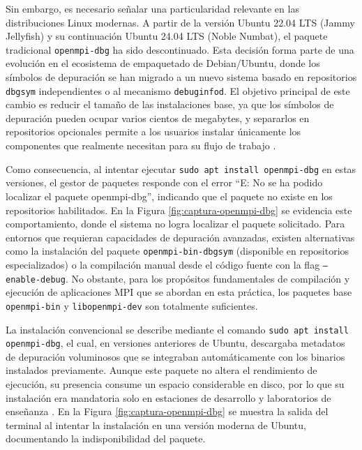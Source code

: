 Sin embargo, es necesario señalar una particularidad relevante en las distribuciones Linux modernas. A partir de la versión Ubuntu 22.04 LTS (Jammy Jellyfish) y su continuación Ubuntu 24.04 LTS (Noble Numbat), el paquete tradicional \texttt{openmpi-dbg} ha sido descontinuado. Esta decisión forma parte de una evolución en el ecosistema de empaquetado de Debian/Ubuntu, donde los símbolos de depuración se han migrado a un nuevo sistema basado en repositorios \texttt{dbgsym} independientes o al mecanismo \texttt{debuginfod}. El objetivo principal de este cambio es reducir el tamaño de las instalaciones base, ya que los símbolos de depuración pueden ocupar varios cientos de megabytes, y separarlos en repositorios opcionales permite a los usuarios instalar únicamente los componentes que realmente necesitan para su flujo de trabajo \cite{ref12_cristian_Ubuntu_Packages}.

Como consecuencia, al intentar ejecutar \texttt{sudo apt install openmpi-dbg} en estas versiones, el gestor de paquetes responde con el error \enquote{E: No se ha podido localizar el paquete openmpi-dbg}, indicando que el paquete no existe en los repositorios habilitados. En la Figura \ref{fig:captura-openmpi-dbg} se evidencia este comportamiento, donde el sistema no logra localizar el paquete solicitado. Para entornos que requieran capacidades de depuración avanzadas, existen alternativas como la instalación del paquete \texttt{openmpi-bin-dbgsym} (disponible en repositorios especializados) o la compilación manual desde el código fuente con la flag \texttt{--enable-debug}. No obstante, para los propósitos fundamentales de compilación y ejecución de aplicaciones MPI que se abordan en esta práctica, los paquetes base \texttt{openmpi-bin} y \texttt{libopenmpi-dev} son totalmente suficientes.

La instalación convencional se describe mediante el comando \texttt{sudo apt install openmpi-dbg}, el cual, en versiones anteriores de Ubuntu, descargaba metadatos de depuración voluminosos que se integraban automáticamente con los binarios instalados previamente. Aunque este paquete no altera el rendimiento de ejecución, su presencia consume un espacio considerable en disco, por lo que su instalación era mandatoria solo en estaciones de desarrollo y laboratorios de enseñanza \cite{ref12_cristian_Ubuntu_Packages}. En la Figura \ref{fig:captura-openmpi-dbg} se muestra la salida del terminal al intentar la instalación en una versión moderna de Ubuntu, documentando la indisponibilidad del paquete.

